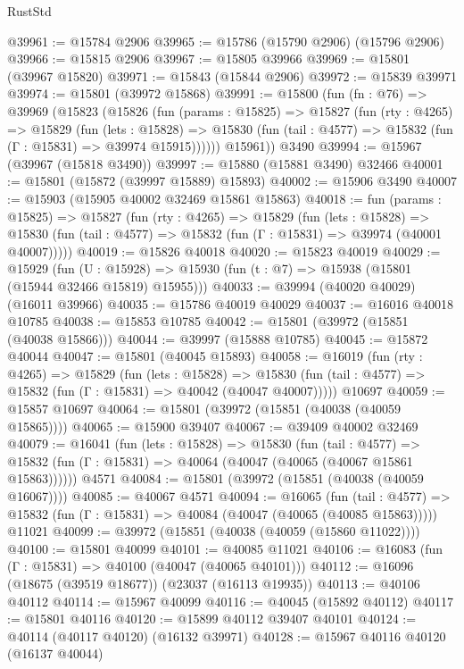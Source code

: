 \begin{lexlean}{RustStd}
\begin{coremodule}
@39961 := @15784 @2906
@39965 := @15786 (@15790 @2906) (@15796 @2906)
@39966 := @15815 @2906
@39967 := @15805 @39966
@39969 := @15801 (@39967 @15820)
@39971 := @15843 (@15844 @2906)
@39972 := @15839 @39971
@39974 := @15801 (@39972 @15868)
@39991 := @15800
    (fun (fn : @76) =>
    @39969
      (@15823
        (@15826
          (fun (params : @15825) =>
          @15827
            (fun (rty : @4265) =>
            @15829
              (fun (lets : @15828) =>
              @15830 (fun (tail : @4577) => @15832 (fun (Γ : @15831) => @39974 @15915))))))
        @15961))
    @3490
@39994 := @15967 (@39967 (@15818 @3490))
@39997 := @15880 (@15881 @3490) @32466
@40001 := @15801 (@15872 (@39997 @15889) @15893)
@40002 := @15906 @3490
@40007 := @15903 (@15905 @40002 @32469 @15861 @15863)
@40018 := fun (params : @15825) =>
  @15827
    (fun (rty : @4265) =>
    @15829
      (fun (lets : @15828) =>
      @15830 (fun (tail : @4577) => @15832 (fun (Γ : @15831) => @39974 (@40001 @40007)))))
@40019 := @15826 @40018
@40020 := @15823 @40019
@40029 := @15929
    (fun (U : @15928) => @15930 (fun (t : @7) => @15938 (@15801 (@15944 @32466 @15819) @15955)))
@40033 := @39994 (@40020 @40029) (@16011 @39966)
@40035 := @15786 @40019 @40029
@40037 := @16016 @40018 @10785
@40038 := @15853 @10785
@40042 := @15801 (@39972 (@15851 (@40038 @15866)))
@40044 := @39997 (@15888 @10785)
@40045 := @15872 @40044
@40047 := @15801 (@40045 @15893)
@40058 := @16019
    (fun (rty : @4265) =>
    @15829
      (fun (lets : @15828) =>
      @15830 (fun (tail : @4577) => @15832 (fun (Γ : @15831) => @40042 (@40047 @40007)))))
    @10697
@40059 := @15857 @10697
@40064 := @15801 (@39972 (@15851 (@40038 (@40059 @15865))))
@40065 := @15900 @39407
@40067 := @39409 @40002 @32469
@40079 := @16041
    (fun (lets : @15828) =>
    @15830
      (fun (tail : @4577) =>
      @15832 (fun (Γ : @15831) => @40064 (@40047 (@40065 (@40067 @15861 @15863))))))
    @4571
@40084 := @15801 (@39972 (@15851 (@40038 (@40059 @16067))))
@40085 := @40067 @4571
@40094 := @16065
    (fun (tail : @4577) => @15832 (fun (Γ : @15831) => @40084 (@40047 (@40065 (@40085 @15863)))))
    @11021
@40099 := @39972 (@15851 (@40038 (@40059 (@15860 @11022))))
@40100 := @15801 @40099
@40101 := @40085 @11021
@40106 := @16083 (fun (Γ : @15831) => @40100 (@40047 (@40065 @40101)))
@40112 := @16096 (@18675 (@39519 @18677)) (@23037 (@16113 @19935))
@40113 := @40106 @40112
@40114 := @15967 @40099
@40116 := @40045 (@15892 @40112)
@40117 := @15801 @40116
@40120 := @15899 @40112 @39407 @40101
@40124 := @40114 (@40117 @40120) (@16132 @39971)
@40128 := @15967 @40116 @40120 (@16137 @40044)

\end{coremodule}
\end{lexlean}
